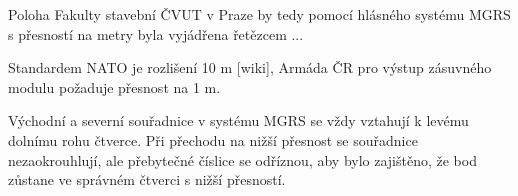 Poloha Fakulty stavební ČVUT v Praze by tedy pomocí hlásného systému MGRS s přesností na metry byla vyjádřena řetězcem ...

Standardem NATO je rozlišení 10 m [wiki], Armáda ČR pro výstup zásuvného modulu požaduje přesnost na 1 m.

Východní a severní souřadnice v systému MGRS se vždy vztahují k levému dolnímu rohu čtverce. Při přechodu na nižší přesnost se souřadnice nezaokrouhlují, ale přebytečné číslice se odříznou, aby bylo zajištěno, že bod zůstane ve správném čtverci s nižší přesností.




